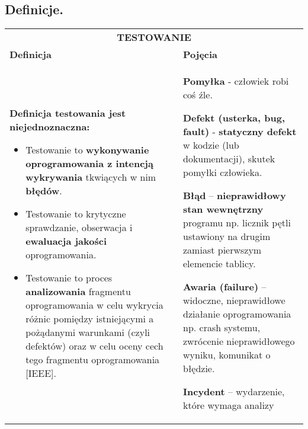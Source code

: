 \documentclass[../main.tex]{subfiles}
\begin{document}
    \subsection{Definicje.}

    \begin{table}[H]
        \begin{center}
            \begin{tabular}{| p{8cm}| p{8cm}|}
                \hline
                \multicolumn{2}{|c|}{\multirow{2}{*}{\textbf{TESTOWANIE}}}\\
                \multicolumn{2}{|c|}{}\\
                \hline
                \hline
                \textbf{Definicja} & \textbf{Pojęcia}\\
                \hline
                \textbf{Definicja testowania jest niejednoznaczna:}
                \begin{itemize}
                    \item Testowanie to \textbf{wykonywanie oprogramowania z intencją wykrywania}
                    tkwiących w nim \textbf{błędów}.
                    \item Testowanie to krytyczne sprawdzanie, obserwacja i \textbf{ewaluacja jakości}
                    oprogramowania.
                    \item Testowanie to proces \textbf{analizowania} fragmentu oprogramowania w celu
                    wykrycia różnic pomiędzy istniejącymi a pożądanymi warunkami (czyli
                    defektów) oraz w celu oceny cech tego fragmentu oprogramowania [IEEE].
                \end{itemize}
                &
                \textbf{Pomyłka} - człowiek robi coś źle.

                \textbf{Defekt (usterka, bug, fault)} - \textbf{statyczny defekt} w kodzie (lub dokumentacji), skutek pomyłki człowieka.

                \textbf{Błąd} – \textbf{nieprawidłowy stan wewnętrzny} programu
                np. licznik pętli ustawiony na drugim zamiast pierwszym elemencie tablicy.

                \textbf{Awaria (failure)} – widoczne, nieprawidłowe działanie oprogramowania
                np. crash systemu, zwrócenie nieprawidłowego wyniku, komunikat o błędzie.

                \textbf{Incydent} – wydarzenie, które wymaga analizy


\end{tabular}
\end{center}
\end{table}
\end{document}
